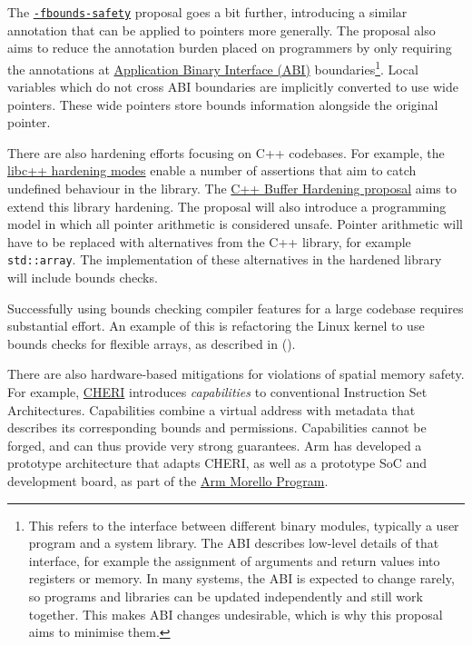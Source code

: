 \documentclass[
  a4paper,
]{report}
\begin{document}
The
\href{https://discourse.llvm.org/t/rfc-enforcing-bounds-safety-in-c-fbounds-safety/70854}{\texttt{-fbounds-safety}}
proposal goes a bit further, introducing a similar annotation that can
be applied to pointers more generally. The proposal also aims to reduce
the annotation burden placed on programmers by only requiring the
annotations at
\href{https://en.wikipedia.org/wiki/Application_binary_interface}{\label{__index_entry_90}{Application
Binary Interface (ABI)}}
boundaries\footnote{This refers to the interface between different
  binary modules, typically a user program and a system library. The ABI
  describes low-level details of that interface, for example the
  assignment of arguments and return values into registers or memory. In
  many systems, the ABI is expected to change rarely, so programs and
  libraries can be updated independently and still work together. This
  makes ABI changes undesirable, which is why this proposal aims to
  minimise them.}. Local variables which do not cross ABI boundaries are
implicitly converted to use wide pointers. These wide pointers store
bounds information alongside the original pointer.

There are also hardening efforts focusing on C++ codebases. For example,
the \href{https://libcxx.llvm.org/Hardening.html}{libc++ hardening
modes} enable a number of assertions that aim to catch undefined
behaviour in the library. The
\href{https://discourse.llvm.org/t/rfc-c-buffer-hardening/65734}{C++
Buffer Hardening proposal} aims to extend this library hardening. The
proposal will also introduce a programming model in which all pointer
arithmetic is considered unsafe. Pointer arithmetic will have to be
replaced with alternatives from the C++ library, for example
\texttt{std::array}. The implementation of these alternatives in the
hardened library will include bounds checks.

Successfully using bounds checking compiler features for a large
codebase requires substantial effort. An example of this is refactoring
the Linux kernel to use bounds checks for flexible arrays, as described
in ().

There are also hardware-based mitigations for violations of spatial
memory safety. For example,
\href{https://www.cl.cam.ac.uk/research/security/ctsrd/cheri/}{CHERI}
introduces
\emph{\label{__index_entry_91}{capabilities}}
to conventional Instruction Set Architectures. Capabilities combine a
virtual address with metadata that describes its corresponding bounds
and permissions. Capabilities cannot be forged, and can thus provide
very strong guarantees. Arm has developed a prototype architecture that
adapts CHERI, as well as a prototype SoC and development board, as part
of the \href{https://www.arm.com/architecture/cpu/morello}{Arm Morello
Program}.
\end{document}
